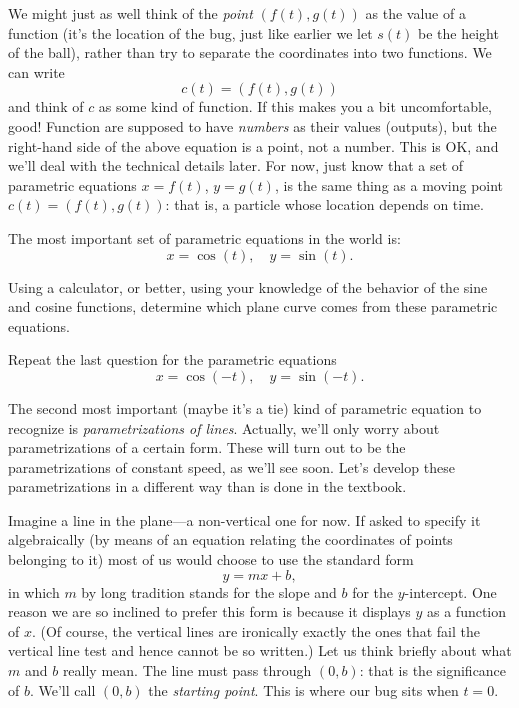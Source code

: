 \documentclass[justified]{tufte-handout}
\begin{document}
We might just as well think of the \emph{point} $(f(t), g(t))$ as the value of a function (it's the location of the bug, just like earlier we let $s(t)$ be the height of the ball), rather than try to separate the coordinates into two functions. We can write
\[
	c(t) = (f(t), g(t))
\]
and think of $c$ as some kind of function. If this makes you a bit uncomfortable, good! Function are supposed to have \emph{numbers} as their values (outputs), but the right-hand side of the above equation is a point, not a number. This is OK, and we'll deal with the technical details later. For now, just know that a set of parametric equations $x = f(t)$, $y = g(t)$, is the same thing as a moving point $c(t) = (f(t),g(t))$: that is, a particle whose location depends on time.

The most important set of parametric equations in the world is:
\[
	x = \cos(t), \quad y = \sin(t).
\]
\begin{marginnote}
	Using a calculator, or better, using your knowledge of the behavior of the sine and cosine functions, determine which plane curve comes from these parametric equations.
\end{marginnote}
\begin{marginnote}
	Repeat the last question for the parametric equations
	\[
		x = \cos(-t), \quad y = \sin(-t).
	\]
\end{marginnote}

The second most important (maybe it's a tie) kind of parametric equation to recognize is \emph{parametrizations of lines}. Actually, we'll only worry about parametrizations of a certain form. These will turn out to be the parametrizations of constant speed, as we'll see soon. Let's develop these parametrizations in a different way than is done in the textbook.

Imagine a line in the plane---a non-vertical one for now. If asked to specify it algebraically (by means of an equation relating the coordinates of points belonging to it) most of us would choose to use the standard form
\[
	y = mx + b,
\]
in which $m$ by long tradition stands for the slope and $b$ for the $y$-intercept. One reason we are so inclined to prefer this form is because it displays $y$ as a function of $x$. (Of course, the vertical lines are ironically exactly the ones that fail the vertical line test and hence cannot be so written.) Let us think briefly about what $m$ and $b$ really mean. The line must pass through $(0,b)$: that is the significance of $b$. We'll call $(0,b)$ the \emph{starting point}. This is where our bug sits when $t = 0$. 
\end{document}
